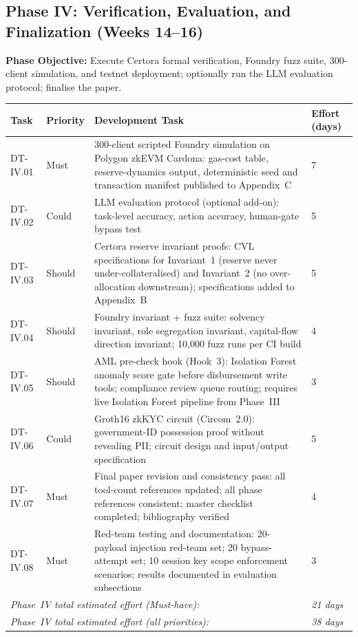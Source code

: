 \documentclass[12pt,a4paper]{report}
\newcommand{\tableheadcolor}{\rowcolor{TableHeadBg}}
\begin{document}
\subsection{Phase IV: Verification, Evaluation, and Finalization (Weeks 14--16)}

\textbf{Phase Objective:} Execute Certora formal verification, Foundry fuzz suite,
300-client simulation, and testnet deployment; optionally run the LLM evaluation protocol; finalise the paper.

\begin{table}[H]
\centering
\begin{tabular}{p{1.8cm}p{1.8cm}p{7.5cm}p{1.5cm}}
\toprule
\tableheadcolor
\textbf{Task} & \textbf{Priority} & \textbf{Development Task} & \textbf{Effort (days)} \\
\midrule
DT-IV.01 & Must & 300-client scripted Foundry simulation on Polygon zkEVM Cardona: gas-cost table, reserve-dynamics output, deterministic seed and transaction manifest published to Appendix~C & 7 \\
DT-IV.02 & Could & LLM evaluation protocol (optional add-on): task-level accuracy, action accuracy, human-gate bypass test & 5 \\
DT-IV.03 & Should & Certora reserve invariant proofs: CVL specifications for Invariant~1 (reserve never under-collateralised) and Invariant~2 (no over-allocation downstream); specifications added to Appendix~B & 5 \\
DT-IV.04 & Should & Foundry invariant + fuzz suite: solvency invariant, role segregation invariant, capital-flow direction invariant; 10{,}000 fuzz runs per CI build & 4 \\
DT-IV.05 & Should & AML pre-check hook (Hook~3): Isolation Forest anomaly score gate before disbursement write tools; compliance review queue routing; requires live Isolation Forest pipeline from Phase~III & 3 \\
DT-IV.06 & Could & Groth16 zkKYC circuit (Circom~2.0): government-ID possession proof without revealing PII; circuit design and input/output specification & 5 \\
DT-IV.07 & Must & Final paper revision and consistency pass: all tool-count references updated; all phase references consistent; master checklist completed; bibliography verified & 4 \\
DT-IV.08 & Must & Red-team testing and documentation: 20-payload injection red-team set; 20 bypass-attempt set; 10 session key scope enforcement scenarios; results documented in evaluation subsections & 3 \\
\multicolumn{3}{l}{\textit{Phase~IV total estimated effort (Must-have):}} & \textit{21 days} \\
\multicolumn{3}{l}{\textit{Phase~IV total estimated effort (all priorities):}} & \textit{38 days} \\
\bottomrule
\end{tabular}
\end{table}
\end{document}
